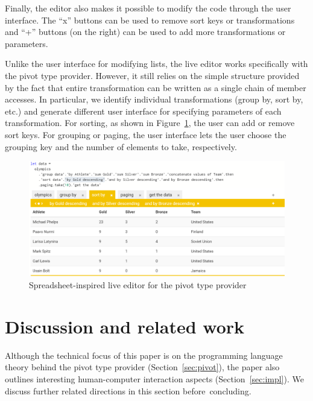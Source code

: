 \documentclass[a4paper,UKenglish]{lipics-v2016}
\theoremstyle{plain}
\theoremstyle{definition}
\newcommand{\qident}[1]{\textnormal{\sffamily \guillemotleft #1\guillemotright}}
\begin{document}
Finally, the editor also makes it possible to modify the code through the user interface. The
``x'' buttons can be used to remove sort keys or transformations and ``+'' buttons (on the right)
can be used to add more transformations or parameters.

Unlike the user interface for modifying lists, the live editor works specifically with the pivot 
type provider. However, it still relies on the simple structure provided by the fact that entire 
transformation can be written as a single chain of member accesses. In particular,
we identify individual transformations (\qident{group by}, \qident{sort by}, etc.) and 
generate different user interface for specifying parameters of each transformation. For sorting, as 
shown in Figure~\ref{fig:case-ed}, the user can add or remove sort keys. For grouping 
or paging, the user interface lets the user choose the grouping key and the number of 
elements to take, respectively.


\begin{figure}[t]
\begin{center}
\includegraphics[scale=0.31,trim=0mm 0mm 0mm 0mm,clip]{images/pivot.png} %
\end{center}
\caption{Spreadsheet-inspired live editor for the pivot type provider}
\label{fig:case-ed}
\end{figure}



\section{Discussion and related work}

Although the technical focus of this paper is on the programming language theory behind the pivot type
provider (Section~\ref{sec:pivot}), the paper also outlines interesting human-computer interaction 
aspects (Section~\ref{sec:impl}). We discuss further related directions in this
section before~concluding.
\end{document}
